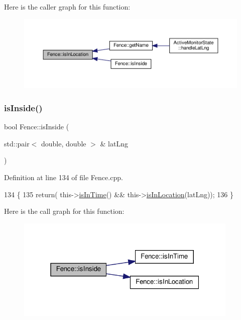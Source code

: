 Here is the caller graph for this function\+:\nopagebreak
\begin{figure}[H]
\begin{center}
\leavevmode
\includegraphics[width=350pt]{d0/db8/class_fence_a80fb7fbb60592d3e8afc0ecb5122b987_icgraph}
\end{center}
\end{figure}
\mbox{\label{class_fence_a224ef2ce3f97de067f996b4722c66797}} 
\subsubsection{\texorpdfstring{is\+Inside()}{isInside()}}
{\footnotesize\ttfamily bool Fence\+::is\+Inside (\begin{DoxyParamCaption}\item[{std\+::pair$<$ double, double $>$ \&}]{lat\+Lng }\end{DoxyParamCaption})}



Definition at line 134 of file Fence.\+cpp.


\begin{DoxyCode}
134                                                     \{
135     \textcolor{keywordflow}{return}( this->\hyperlink{class_fence_a7695b0f94f461369703188a287a38ab4}{isInTime}() && this->\hyperlink{class_fence_a80fb7fbb60592d3e8afc0ecb5122b987}{isInLocation}(latLng));
136 \}
\end{DoxyCode}
Here is the call graph for this function\+:\nopagebreak
\begin{figure}[H]
\begin{center}
\leavevmode
\includegraphics[width=301pt]{d0/db8/class_fence_a224ef2ce3f97de067f996b4722c66797_cgraph}
\end{center}
\end{figure}
\mbox{\label{class_fence_a7695b0f94f461369703188a287a38ab4}} 
